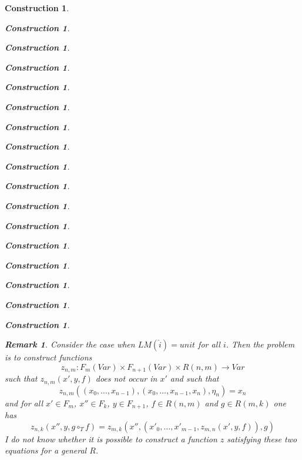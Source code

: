 \documentclass[12pt]{amsart}
\newenvironment{eq}{\begin{equation}}{\end{equation}}
\newtheorem{remark}[proposition]{Remark}
\newtheorem{construction}[proposition]{Construction}
\newcommand{\llabel}[1]{\label{#1}}
\newcommand{\sr}{\rightarrow}
\newcommand{\wh}{\widehat}
\newcommand{\hc}{\circ_{T}}
\begin{document}
\begin{construction}
\begin{construction}
\begin{construction}
\begin{construction}
\begin{construction}
\begin{construction}
\begin{construction}
\begin{construction}
\begin{construction}
\begin{construction}
\begin{construction}
\begin{construction}
\begin{construction}
\begin{construction}
\begin{construction}
\begin{construction}
\begin{construction}
{\begin{remark}
Consider the case when $LM(\wh{i})=unit$ for all $i$. Then the problem is to
construct functions
%
$$z_{n,m}:F_m(Var)\times F_{n+1}(Var)\times R(n,m)\sr Var$$
%
such that $z_{n,m}(x',y,f)$ does not occur in $x'$ and such that
%
\begin{eq}
\llabel{2015.08.22.eq1b}
z_{n,m}((x_0,\dots,x_{n-1}),(x_0,\dots,x_{n-1},x_n),\eta_n)=x_n
\end{eq}%
%
and for all $x'\in F_{m}$, $x''\in F_{k}$, $y\in F_{n+1}$, $f\in R(n,m)$ and $g\in R(m,k)$ one has
%
\begin{eq}
\llabel{2015.08.22.eq2b}
z_{n,k}(x'',y,g\hc f)=z_{m,k}(x'',(x'_0,\dots,x'_{m-1},z_{m,n}(x',y,f)),g)
\end{eq}%
%
I do not know whether it is possible to construct a function $z$ satisfying
these two equations for a general $R$.
\end{remark}
%
}


\end{construction}
\end{construction}
\end{construction}
\end{construction}
\end{construction}
\end{construction}
\end{construction}
\end{construction}
\end{construction}
\end{construction}
\end{construction}
\end{construction}
\end{construction}
\end{construction}
\end{construction}
\end{construction}
\end{construction}
\end{document}
